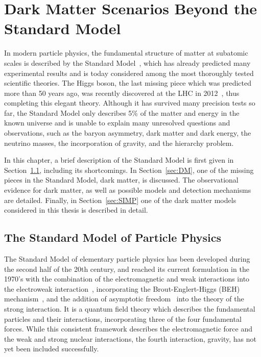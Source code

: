 \graphicspath{{intro/}{theory/}}

\renewcommand\evenpagerightmark{{\scshape\small Chapter 2}}
\renewcommand\oddpageleftmark{{\scshape\small Dark Matter Scenarios Beyond the Standard Model}}


\hyphenation{}

\chapter{Dark Matter Scenarios Beyond the Standard Model}
\label{ch:theory}

In modern particle physics, the fundamental structure of matter at subatomic scales is described by the Standard Model~\cite{Peskin:257493, BSMWiley}, which has already predicted many experimental results and is today considered among the most thoroughly tested scientific theories. The Higgs boson, the last missing piece which was predicted more than 50 years ago, was recently discovered at the \ac{LHC} in 2012~\cite{Aad:2012tfa, Chatrchyan:2012xdj}, thus completing this elegant theory. Although it has survived many precision tests so far, the Standard Model only describes 5\% of the matter and energy in the known universe and is unable to explain many unresolved questions and observations, such as the baryon asymmetry, dark matter and dark energy, the neutrino masses, the incorporation of gravity, and the hierarchy problem.

In this chapter, a brief description of the Standard Model is first given in Section~\ref{sec:SM}, including its shortcomings. In Section~\ref{sec:DM}, one of the missing pieces in the Standard Model, dark matter, is discussed. The observational evidence for dark matter, as well as possible models and detection mechanisms are detailed. Finally, in Section~\ref{sec:SIMP} one of the dark matter models considered in this thesis is described in detail.

\section{The Standard Model of Particle Physics}
\label{sec:SM}

The Standard Model of elementary particle physics has been developed during the second half of the 20th century, and reached its current formulation in the 1970's with the combination of the electromagnetic and weak interactions into the electroweak interaction~\cite{Glashow:1959wxa, Weinberg:1967tq, Salam:1959zz}, incorporating the Brout-Englert-Higgs (BEH) mechanism~\cite{Englert:1964et,Higgs:1964pj,Guralnik:1964eu}, and the addition of asymptotic freedom~\cite{Gross:1973id, Politzer:1973fx} into the theory of the strong interaction.
It is a quantum field theory which describes the fundamental particles and their interactions, incorporating three of the four fundamental forces. While this consistent framework describes the electromagnetic force and the weak and strong nuclear interactions, the fourth interaction, gravity, has not yet been included successfully.

